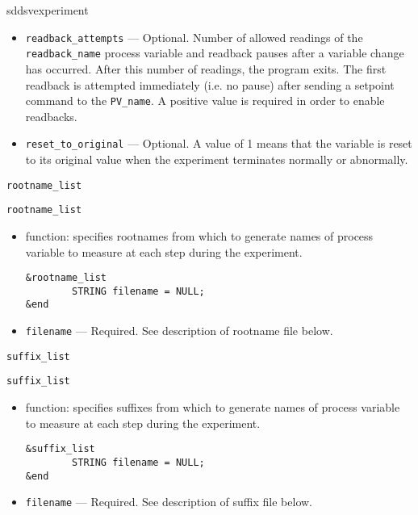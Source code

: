 \begin{sddsprog}{sddsvexperiment}
\begin{itemize}
\begin{itemize}
   \item {\verb+readback_attempts+} --- Optional. Number of allowed
       readings of the {\verb+readback_name+} process variable and
       readback pauses after a variable change has occurred.  After
       this number of readings, the program exits.  The first readback
       is attempted immediately (i.e. no pause) after sending a
       setpoint command to the {\verb+PV_name+}.  A positive value is
       required in order to enable readbacks.

   \item {\verb+reset_to_original+} --- Optional. A value of 1 means
       that the variable is reset to its original value when the
       experiment terminates normally or abnormally.
\end{itemize}


\begin{latexonly}
\newpage\begin{center}{\Large \verb+rootname_list+}\end{center}
\end{latexonly}
\begin{htmlonly}
\item {\Large \verb+rootname_list+}
\end{htmlonly}

\begin{itemize}
   \item function: specifies rootnames from which to generate names of process variable to measure at each step during the experiment.
\begin{verbatim}
&rootname_list
        STRING filename = NULL;
&end
\end{verbatim}
   \item {\verb+filename+} --- Required. See description of rootname file below.
\end{itemize}

\begin{latexonly}
\begin{center}{\Large \verb+suffix_list+}\end{center}
\end{latexonly}
\begin{htmlonly}
\item {\Large \verb+suffix_list+}
\end{htmlonly}
\begin{itemize}
   \item function: specifies suffixes from which to generate names of process variable to measure at each step during the experiment.
\begin{verbatim}
&suffix_list
        STRING filename = NULL;
&end
\end{verbatim}
   \item {\verb+filename+} --- Required. See description of suffix file below.
\end{itemize}


\end{itemize}
\end{sddsprog}
